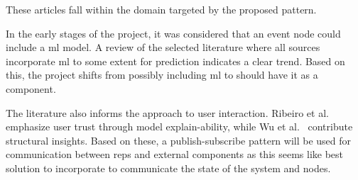 		These articles fall within the domain targeted by the proposed pattern.
	
		In the early stages of the project, it was considered that an event node could include a \gls{ml} model. A review of the selected literature where all sources incorporate \gls{ml} to some extent for prediction indicates a clear trend. Based on this, the project shifts from possibly including \gls{ml} to should have it as a component. 
		
		The literature also informs the approach to user interaction. Ribeiro et al.~\cite{Ribeiro} emphasize user trust through model explain-ability, while Wu et al.~\cite{WuPan} contribute structural insights. Based on these, a publish-subscribe pattern will be used for communication between \gls{reps} and external components as this seems like best solution to incorporate to communicate the state of the system and nodes.